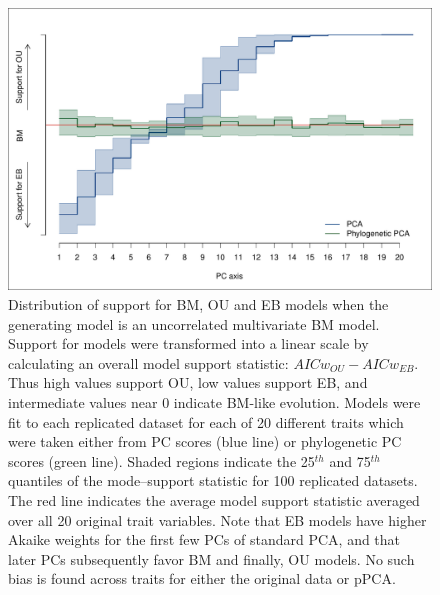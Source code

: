 \documentclass[a4paper,11pt]{article}
\begin{document}
\begin{figure}[p]
\centering
\includegraphics[scale=0.65]{./fig/uncor-bm-aic.pdf}
\caption{Distribution of support for BM, OU and EB models when the generating model is an uncorrelated multivariate BM model. Support for models were transformed into a linear scale by calculating an overall model support statistic: $AICw_{OU} - AICw_{EB}$. Thus high values support OU, low values support EB, and intermediate values near 0 indicate BM-like evolution. Models were fit to each replicated dataset for each of 20 different traits which were taken either from PC scores (blue line) or phylogenetic PC scores (green line). Shaded regions indicate the  25$^{th}$ and 75$^{th}$ quantiles of the mode--support statistic for  100 replicated datasets. The red  line indicates the average model support statistic averaged over all 20 original trait variables. Note that EB models have higher Akaike weights for the first few PCs of standard PCA, and that later PCs subsequently favor BM and finally, OU models. No such bias is found across traits for either the original data or pPCA.}
\label{aicwbm}
\end{figure}
\end{document}
